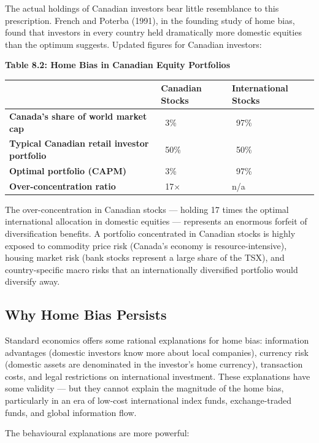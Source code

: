\documentclass[12pt, letterpaper]{article}
\begin{document}
The actual holdings of Canadian investors bear little resemblance to this prescription. French and Poterba (1991), in the founding study of home bias, found that investors in every country held dramatically more domestic equities than the optimum suggests. Updated figures for Canadian investors:

\textbf{Table 8.2: Home Bias in Canadian Equity Portfolios}


\begin{table}[H]
\centering
\small
\begin{tabularx}{\linewidth}{lYY}
\toprule
 & Canadian Stocks & International Stocks \\
\midrule
\textbf{Canada's share of world market cap} & ~3\% & ~97\% \\
\textbf{Typical Canadian retail investor portfolio} & ~50\% & ~50\% \\
\textbf{Optimal portfolio (CAPM)} & ~3\% & ~97\% \\
\textbf{Over-concentration ratio} & ~17$\times$ & n/a \\
\bottomrule
\end{tabularx}
\end{table}


The over-concentration in Canadian stocks --- holding 17 times the optimal international allocation in domestic equities --- represents an enormous forfeit of diversification benefits. A portfolio concentrated in Canadian stocks is highly exposed to commodity price risk (Canada's economy is resource-intensive), housing market risk (bank stocks represent a large share of the TSX), and country-specific macro risks that an internationally diversified portfolio would diversify away.


\subsection{Why Home Bias Persists}


Standard economics offers some rational explanations for home bias: information advantages (domestic investors know more about local companies), currency risk (domestic assets are denominated in the investor's home currency), transaction costs, and legal restrictions on international investment. These explanations have some validity --- but they cannot explain the magnitude of the home bias, particularly in an era of low-cost international index funds, exchange-traded funds, and global information flow.

The behavioural explanations are more powerful:
\end{document}
